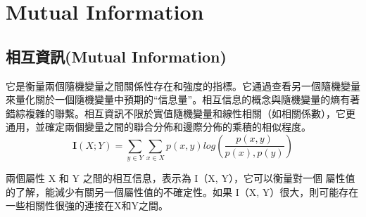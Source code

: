 \chapter{Mutual Information}
\label{chapter:intro}
\section{相互資訊(Mutual Information)}
它是衡量兩個隨機變量之間關係性存在和強度的指標。它通過查看另一個隨機變量來量化關於一個隨機變量中預期的“信息量”。相互信息的概念與隨機變量的熵有著錯綜複雜的聯繫。相互資訊不限於實值隨機變量和線性相關（如相關係數），它更通用，並確定兩個變量之間的聯合分佈和邊際分佈的乘積的相似程度。
\begin{equation}
\label{equ:mi}
    \textbf{I}(X;Y)=\sum_{y\in Y}^{}\sum_{x\in X}^{}p(x,y)log(\frac{p(x,y)}{p(x),p(y)})
\end{equation}

        兩個屬性 X 和 Y 之間的相互信息，表示為 I（X, Y），它可以衡量對一個 屬性值的了解，能減少有關另一個屬性值的不確定性。如果 I（X, Y）很大，則可能存在一些相關性很強的連接在X和Y之間。



